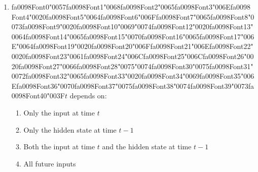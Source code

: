 \documentclass[12pt]{article}
\begin{document}
\begin{enumerate}[label=Q\arabic*.]
\item {\csname fa0098Font0\endcsname\char"0057}{\csname fa0098Font1\endcsname\char"0068}{\csname fa0098Font2\endcsname\char"0065}{\csname fa0098Font3\endcsname\char"006E}{\csname fa0098Font4\endcsname\char"0020}{\csname fa0098Font5\endcsname\char"0064}{\csname fa0098Font6\endcsname\char"006F}{\csname fa0098Font7\endcsname\char"0065}{\csname fa0098Font8\endcsname\char"0073}{\csname fa0098Font9\endcsname\char"0020}{\csname fa0098Font10\endcsname\char"0069}{\char"0074}{\csname fa0098Font12\endcsname\char"0020}{\csname fa0098Font13\endcsname\char"0064}{\csname fa0098Font14\endcsname\char"0065}{\csname fa0098Font15\endcsname\char"0070}{\csname fa0098Font16\endcsname\char"0065}{\csname fa0098Font17\endcsname\char"006E}{\char"0064}{\csname fa0098Font19\endcsname\char"0020}{\csname fa0098Font20\endcsname\char"006F}{\csname fa0098Font21\endcsname\char"006E}{\csname fa0098Font22\endcsname\char"0020}{\csname fa0098Font23\endcsname\char"0061}{\csname fa0098Font24\endcsname\char"006C}{\csname fa0098Font25\endcsname\char"006C}{\csname fa0098Font26\endcsname\char"0020}{\csname fa0098Font27\endcsname\char"0066}{\csname fa0098Font28\endcsname\char"0075}{\char"0074}{\csname fa0098Font30\endcsname\char"0075}{\csname fa0098Font31\endcsname\char"0072}{\csname fa0098Font32\endcsname\char"0065}{\csname fa0098Font33\endcsname\char"0020}{\csname fa0098Font34\endcsname\char"0069}{\csname fa0098Font35\endcsname\char"006E}{\csname fa0098Font36\endcsname\char"0070}{\csname fa0098Font37\endcsname\char"0075}{\csname fa0098Font38\endcsname\char"0074}{\csname fa0098Font39\endcsname\char"0073}{\csname fa0098Font40\endcsname\char"003F}$t$ depends on:
\begin{enumerate}[label=(\Alph*)]
    \item Only the input at time $t$
    \item Only the hidden state at time $t-1$
    \item Both the input at time $t$ and the hidden state at time $t-1$
    \item All future inputs
\end{enumerate}

\end{enumerate}
\end{document}
